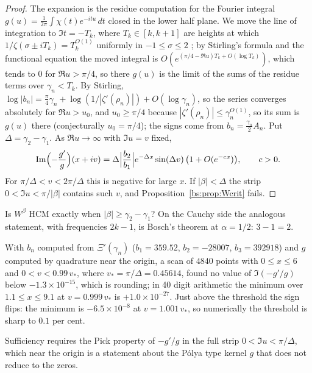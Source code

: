 \begin{proof}
The expansion is the residue computation for the Fourier integral $g(u)=\frac1{2\pi}\int\chi(t)e^{-itu}\,dt$ closed in the lower half plane. We move the line of integration to $\Im t=-T_k$, where $T_k\in[k,k+1]$ are heights at which $1/\zeta(\sigma\pm iT_k)=T_k^{O(1)}$ uniformly in $-1\le\sigma\le2$ \cite[Theorem 9.7]{Titchmarsh}; by Stirling's formula and the functional equation the moved integral is $O(e^{(\pi/4-\Re u)T_k+O(\log T_k)})$, which tends to $0$ for $\Re u>\pi/4$, so there $g(u)$ is the limit of the sums of the residue terms over $\gamma_n<T_k$. By Stirling, $\log|b_n|=\frac\pi4\gamma_n+\log(1/|\zeta'(\rho_n)|)+O(\log\gamma_n)$, so the series converges absolutely for $\Re u>u_0$, and $u_0\ge\pi/4$ because $|\zeta'(\rho_n)|\le\gamma_n^{O(1)}$, so its sum is $g(u)$ there (conjecturally $u_0=\pi/4$); the signs come from $b_n=\frac{\gamma_n}2A_n$. Put $\Delta=\gamma_2-\gamma_1$. As $\Re u\to\infty$ with $\Im u=v$ fixed,
\[
\Im\Bigl(-\frac{g'}{g}\Bigr)(x+iv)=\Delta\Bigl|\frac{b_2}{b_1}\Bigr|e^{-\Delta x}\sin(\Delta v)\,\bigl(1+O(e^{-cx})\bigr),\qquad c>0.
\]
For $\pi/\Delta<v<2\pi/\Delta$ this is negative for large $x$. If $|\beta|<\Delta$ the strip $0<\Im u<\pi/|\beta|$ contains such $v$, and Proposition~\ref{bs:prop:Wcrit} fails.
\end{proof}

\begin{question}\label{bs:q:gap}
Is $W^\beta$ HCM exactly when $|\beta|\ge\gamma_2-\gamma_1$? On the Cauchy side the analogous statement, with frequencies $2k-1$, is Bosch's theorem at $\alpha=1/2$: $3-1=2$.
\end{question}

With $b_n$ computed from $\Xi'(\gamma_n)$ ($b_1=359.52$, $b_2=-28007$, $b_3=392918$) and $g$ computed by quadrature near the origin, a scan of $4840$ points with $0\le x\le6$ and $0<v<0.99\,v_*$, where $v_*=\pi/\Delta=0.45614$, found no value of $\Im(-g'/g)$ below $-1.3\times10^{-15}$, which is rounding; in 40 digit arithmetic the minimum over $1.1\le x\le9.1$ at $v=0.999\,v_*$ is $+1.0\times10^{-27}$. Just above the threshold the sign flips: the minimum is $-6.5\times10^{-8}$ at $v=1.001\,v_*$, so numerically the threshold is sharp to $0.1$ per cent.

Sufficiency requires the Pick property of $-g'/g$ in the full strip $0<\Im u<\pi/\Delta$, which near the origin is a statement about the P\'olya type kernel $g$ that does not reduce to the zeros.

